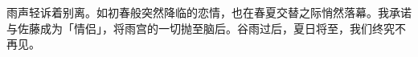 雨声轻诉着别离。如初春般突然降临的恋情，也在春夏交替之际悄然落幕。我承诺与佐藤成为「情侣」，将雨宫的一切抛至脑后。谷雨过后，夏日将至，我们终究不再见。

\cutlinea




%	
%	


\newpage





